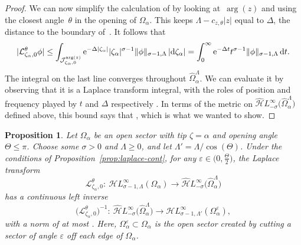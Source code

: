 \documentclass[pdftex]{sigma}
\newcommand{\singexp}[2]{\mathcal{H}L^\infty_{#1, #2}}
\newcommand{\dualsingexp}[1]{\widehat{\mathcal{H}}L^\infty_{#1}}
\newcommand{\maps}{\colon}
\newcommand{\laplace}{\mathcal{L}}
\numberwithin{equation}{section}
\newtheorem{Proposition}[Theorem]{Proposition}
 { \theoremstyle{definition}
\newtheorem{Definition}[Theorem]{Definition}
\newtheorem{Remark}[Theorem]{Remark}
\newtheorem*{notation*}{Notation}
}
\begin{document}
\begin{proof}
We can now simplify the calculation of \smash{$\laplace_{\zeta_\alpha, 0}^\theta \phi$} by looking at~$\arg(z)$ and using the closest angle~$\theta$ in the opening of $\Omega_\alpha$. This keeps $\Lambda - c_{z, \theta}|z|$ equal to $\Delta$, the distance to the boundary of~\smash{$\widehat{\Omega}_\alpha^\Lambda$}. It follows that
\begin{equation*}
|\laplace_{\zeta_\alpha, 0}^\theta \phi| \le \int_{\mathcal{J}_{\zeta_\alpha, 0}^{\arg(z)}} {\rm e}^{-\Delta|\zeta_\alpha|} |\zeta_\alpha|^{\sigma-1} \|\phi\|_{\sigma-1, \Lambda}\, |{\rm d}\zeta_\alpha| = \int_0^\infty {\rm e}^{-\Delta t} t^{\sigma-1} \|\phi\|_{\sigma-1, \Lambda} \,{\rm d}t.
\end{equation*}
The integral on the last line converges throughout $\widehat{\Omega}_\alpha^\Lambda$. We can evaluate it by observing that it is a Laplace transform integral, with the roles of position and frequency played by $t$ and $\Delta$ respectively
\smash{$\big|\laplace_{\zeta_\alpha, 0}^\theta \phi\big| \le \Gamma(\sigma) \Delta^{-\sigma} \|\phi\|_{\sigma-1, \Lambda}$}.
In terms of the metric on $\dualsingexp{-\sigma}\bigl(\widehat{\Omega}_\alpha^\Lambda\bigr)$ defined above, this bound says that
\smash{$\big\|\laplace_{\zeta_\alpha, 0}^\theta \phi\big\|_{-\sigma, \Lambda} \le \Gamma(\sigma) \|\phi\|_{\sigma-1, \Lambda}$},
which is what we wanted to show.
\end{proof}

\begin{Proposition}\label{prop:inverse_laplace_analytic}
Let $\Omega_\alpha$ be an open sector with tip $\zeta = \alpha$ and opening angle $\Theta \le \pi$. Choose some $\sigma > 0$ and $\Lambda \ge 0$, and let $\Lambda' = \Lambda / \cos(\Theta)$. Under the conditions of Proposition~{\rm\ref{prop:laplace-cont}}, for any $\varepsilon \in \big(0, \frac{\Theta}{2}\big)$, the Laplace transform
\[ \laplace_{\zeta_\alpha, 0}^\theta \maps\ \singexp{\sigma-1}{\Lambda}(\Omega_\alpha) \to \dualsingexp{-\sigma}\bigl(\widehat{\Omega}_\alpha^\Lambda\bigr) \]
has a continuous left inverse
\[ \bigl(\laplace_{\zeta_\alpha, 0}^\theta\bigr)^{-1} \maps\ \dualsingexp{-\sigma}\bigl(\widehat{\Omega}_\alpha^\Lambda\bigr) \to \singexp{\sigma-1}{\Lambda'}(\Omega_\alpha^\varepsilon), \]
with a norm of at most
.
Here, $\Omega_\alpha^\varepsilon \subset \Omega_\alpha$ is the open sector created by cutting a sector of angle $\varepsilon$ off each edge of $\Omega_\alpha$.
\end{Proposition}
\end{document}
